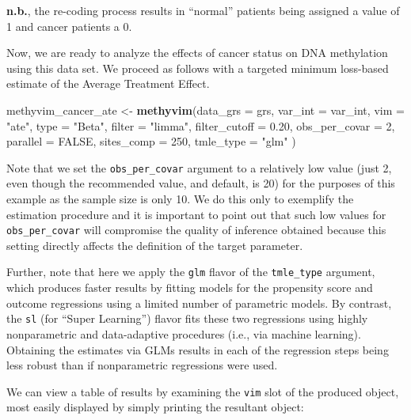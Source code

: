 \documentclass[9pt,a4paper,]{extarticle}
\newenvironment{Shaded}{\begin{snugshade}}{\end{snugshade}}
\newcommand{\DataTypeTok}[1]{\textcolor[rgb]{0.13,0.29,0.53}{#1}}
\newcommand{\DecValTok}[1]{\textcolor[rgb]{0.00,0.00,0.81}{#1}}
\newcommand{\FloatTok}[1]{\textcolor[rgb]{0.00,0.00,0.81}{#1}}
\newcommand{\KeywordTok}[1]{\textcolor[rgb]{0.13,0.29,0.53}{\textbf{#1}}}
\newcommand{\NormalTok}[1]{#1}
\newcommand{\OtherTok}[1]{\textcolor[rgb]{0.56,0.35,0.01}{#1}}
\newcommand{\StringTok}[1]{\textcolor[rgb]{0.31,0.60,0.02}{#1}}
\theoremstyle{definition}
\theoremstyle{definition}
\theoremstyle{definition}
\theoremstyle{remark}
\begin{document}
\textbf{n.b.}, the re-coding process results in ``normal'' patients being assigned a
value of 1 and cancer patients a 0.

Now, we are ready to analyze the effects of cancer status on DNA methylation
using this data set. We proceed as follows with a targeted minimum loss-based
estimate of the Average Treatment Effect.

\begin{Shaded}
\begin{Highlighting}[]
\NormalTok{methyvim_cancer_ate <-}\StringTok{ }\KeywordTok{methyvim}\NormalTok{(}\DataTypeTok{data_grs =}\NormalTok{ grs, }\DataTypeTok{var_int =}\NormalTok{ var_int,}
                                \DataTypeTok{vim =} \StringTok{"ate"}\NormalTok{, }\DataTypeTok{type =} \StringTok{"Beta"}\NormalTok{, }\DataTypeTok{filter =} \StringTok{"limma"}\NormalTok{,}
                                \DataTypeTok{filter_cutoff =} \FloatTok{0.20}\NormalTok{, }\DataTypeTok{obs_per_covar =} \DecValTok{2}\NormalTok{,}
                                \DataTypeTok{parallel =} \OtherTok{FALSE}\NormalTok{, }\DataTypeTok{sites_comp =} \DecValTok{250}\NormalTok{,}
                                \DataTypeTok{tmle_type =} \StringTok{"glm"}
\NormalTok{                               )}
\end{Highlighting}
\end{Shaded}

Note that we set the \texttt{obs\_per\_covar} argument to a relatively low value (just 2,
even though the recommended value, and default, is 20) for the purposes of this
example as the sample size is only 10. We do this only to exemplify the
estimation procedure and it is important to point out that such low values for
\texttt{obs\_per\_covar} will compromise the quality of inference obtained because this
setting directly affects the definition of the target parameter.

Further, note that here we apply the \texttt{glm} flavor of the \texttt{tmle\_type} argument,
which produces faster results by fitting models for the propensity score and
outcome regressions using a limited number of parametric models. By contrast,
the \texttt{sl} (for ``Super Learning'') flavor fits these two regressions using highly
nonparametric and data-adaptive procedures (i.e., via machine learning).
Obtaining the estimates via GLMs results in each of the regression steps
being less robust than if nonparametric regressions were used.

We can view a table of results by examining the \texttt{vim} slot of the produced
object, most easily displayed by simply printing the resultant object:
\end{document}
